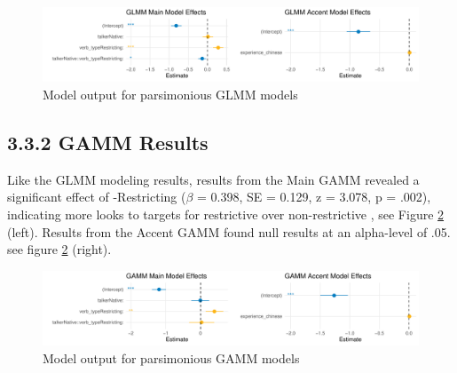 \begin{figure}[H]
    \centering
    \includegraphics[width=\textwidth]{figures/GLMM_cow_model.pdf}
    \caption{Model output for parsimonious GLMM models}
    \label{fig:GLMM_cow_model}
\end{figure}

\subsection{3.3.2 GAMM Results}

Like the GLMM modeling results, results from the Main GAMM revealed a significant effect of  -Restricting  ($\beta$ = 0.398, SE = 0.129, z = 3.078, p = .002), indicating more looks to targets for restrictive  over non-restrictive , see Figure \ref{fig:GAMM_cow_model} (left). Results from the Accent GAMM found null results at an alpha-level of .05. see figure \ref{fig:GAMM_cow_model} (right).

\begin{figure}[H]
    \centering
    \includegraphics[width=\textwidth]{figures/GAMM_cow_model.pdf}
    \caption{Model output for parsimonious GAMM models}
    \label{fig:GAMM_cow_model}
\end{figure}
\newline
\newline